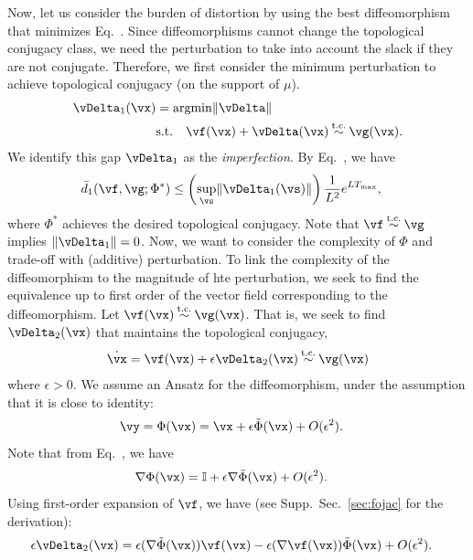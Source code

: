 \documentclass{article}
\theoremstyle{definition} \newtheorem{definition}{Definition}  \newtheorem{example}{Example}
\theoremstyle{remark} \newtheorem{remark}{Remark}
\renewcommand{\eqref}{Eq.~\originaleqref}
\newcounter{ct}
\DeclareMathOperator*{\argmin}{\rm argmin}
\DeclarePairedDelimiter{\norm}{\lVert}{\rVert}
\newcommand{\tconju}{\mathbin{\overset{\text{t.c.}}{\sim}}}
\newcommand{\identity}{\ensuremath{\mathbb{I}}}
\newcommand{\homeo}{\Phi} %
\begin{document}
Now, let us consider the burden of distortion by using the best diffeomorphism that minimizes \eqref{eq:ed1}.
Since diffeomorphisms cannot change the topological conjugacy class, we need the perturbation to take into account the slack if they are not conjugate.
Therefore, we first consider the minimum perturbation to achieve topological conjugacy (on the support of $\mu$).
\begin{align}
    \vDelta_1(\vx) &= \argmin \norm{\vDelta}
    \label{eq:d1:min}
    \\
    & \text{s.t.} \quad
    \vf(\vx) + \vDelta(\vx)
    \tconju
    \vg(\vx).
    \label{eq:d1:tc}
\end{align}
We identify this gap $\vDelta_1$ as the \emph{imperfection}.
By \eqref{eq:d0bound}, we have
\begin{align}
    \bar{d}_1(\vf, \vg; \homeo^\ast)
	&\leq
	\left(\sup_\vs \norm{\vDelta_1(\vs)}\right) \frac{1}{L^2} e^{LT_{\text{max}}},
\end{align}
where $\homeo^\ast$ achieves the desired topological conjugacy.
Note that $\vf \tconju \vg$ implies $\norm{\vDelta_1} = 0$.
Now, we want to consider the complexity of $\homeo$ and trade-off with (additive) perturbation.
To link the complexity of the diffeomorphism to the magnitude of hte perturbation, we seek to find the equivalence up to first order of the vector field corresponding to the diffeomorphism.
Let
$
\vf(\vx)
    \tconju
\vg(\vx)
$.
That is, we seek to find $\vDelta_2(\vx)$ that maintains the topological conjugacy,
\begin{align}
    \dot\vx = \vf(\vx) + \epsilon \vDelta_2(\vx)
    \tconju
    \vg(\vx)
    \label{eq:pareto:tc}
\end{align}
where $\epsilon > 0$.
We assume an Ansatz for the diffeomorphism, under the assumption that it is close to identity:
\begin{align}\label{eq:h:ansatz}
    \vy &= \homeo(\vx) = \vx + \epsilon \tilde\homeo(\vx) + O(\epsilon^2).
\end{align}
Note that from \eqref{eq:h:ansatz}, we have
\begin{align}
    \nabla\homeo(\vx) &= \identity + \epsilon\nabla\tilde\homeo(\vx) + O(\epsilon^2).
\end{align}
Using first-order expansion of $\vf$, we have (see Supp.~Sec.~\ref{sec:fojac} for the derivation):
\begin{align}
    \epsilon \vDelta_2(\vx) &=
	\epsilon (\nabla\tilde\homeo(\vx)) \vf(\vx)
	-
	\epsilon (\nabla\vf(\vx)) \tilde\homeo(\vx)
	+ O(\epsilon^2).
\end{align}
\end{document}
